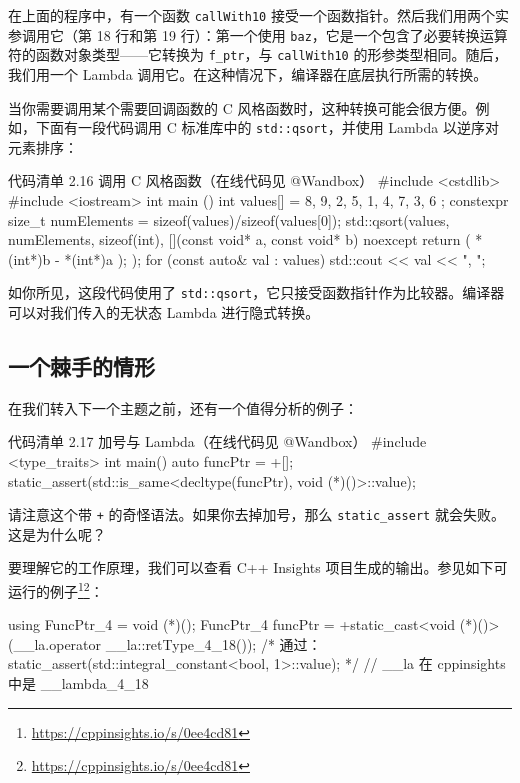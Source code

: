 \begin{codebox}
在上面的程序中，有一个函数 \texttt{callWith10} 接受一个函数指针。然后我们用两个实参调用它（第 18 行和第 19 行）：第一个使用 \texttt{baz}，它是一个包含了必要转换运算符的函数对象类型——它转换为 \texttt{f\_ptr}，与 \texttt{callWith10} 的形参类型相同。随后，我们用一个 Lambda 调用它。在这种情况下，编译器在底层执行所需的转换。

当你需要调用某个需要回调函数的 C 风格函数时，这种转换可能会很方便。例如，下面有一段代码调用 C 标准库中的 \texttt{std::qsort}，并使用 Lambda 以逆序对元素排序：

\begin{codeboxt}{代码清单 2.16 调用 C 风格函数（在线代码见 @Wandbox）}
#include <cstdlib>
#include <iostream>
int main () {
int values[] = { 8, 9, 2, 5, 1, 4, 7, 3, 6 };
constexpr size_t numElements = sizeof(values)/sizeof(values[0]);
std::qsort(values, numElements, sizeof(int),
[](const void* a, const void* b) noexcept {
return ( *(int*)b - *(int*)a );
}
);
for (const auto& val : values)
std::cout << val << ", ";
}
\end{codeboxt}

如你所见，这段代码使用了 \texttt{std::qsort}，它只接受函数指针作为比较器。编译器可以对我们传入的无状态 Lambda 进行隐式转换。

\subsection{一个棘手的情形}

在我们转入下一个主题之前，还有一个值得分析的例子：

\begin{codeboxt}{代码清单 2.17 加号与 Lambda（在线代码见 @Wandbox）}
#include <type_traits>
int main() {
auto funcPtr = +[]{};
static_assert(std::is_same<decltype(funcPtr), void (*)()>::value);
}
\end{codeboxt}

请注意这个带 \texttt{+} 的奇怪语法。如果你去掉加号，那么 \texttt{static\_assert} 就会失败。这是为什么呢？

要理解它的工作原理，我们可以查看 C++ Insights 项目生成的输出。参见如下可运行的例子\footnote{\url{https://cppinsights.io/s/0ee4cd81}}\footnote{\url{https://cppinsights.io/s/0ee4cd81}}：

\begin{codebox}
using FuncPtr_4 = void (*)();
FuncPtr_4 funcPtr =
+static_cast<void (*)()>(__la.operator __la::retType_4_18());
/* 通过：static_assert(std::integral_constant<bool, 1>::value); */
// __la 在 cppinsights 中是 __lambda_4_18
\end{codebox}


\end{codebox}
